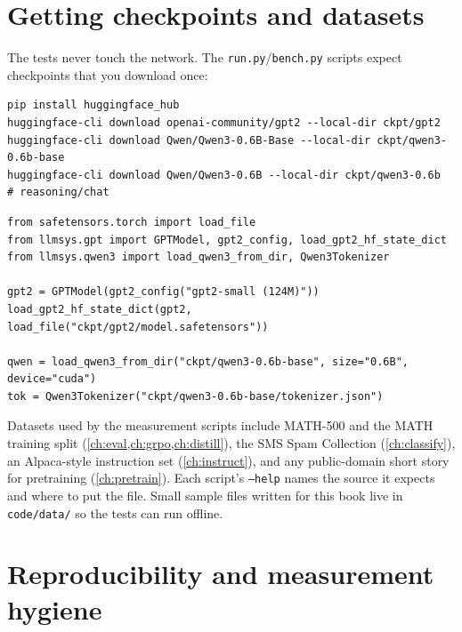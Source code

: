 \section{Getting checkpoints and datasets}

The tests never touch the network. The \texttt{run.py}/\texttt{bench.py} scripts expect
checkpoints that you download once:

\begin{lstlisting}[style=shell]
pip install huggingface_hub
huggingface-cli download openai-community/gpt2 --local-dir ckpt/gpt2
huggingface-cli download Qwen/Qwen3-0.6B-Base --local-dir ckpt/qwen3-0.6b-base
huggingface-cli download Qwen/Qwen3-0.6B --local-dir ckpt/qwen3-0.6b   # reasoning/chat
\end{lstlisting}

\begin{lstlisting}[caption={Loading the downloaded checkpoints into our from-scratch modules.},label={lst:setup:load}]
from safetensors.torch import load_file
from llmsys.gpt import GPTModel, gpt2_config, load_gpt2_hf_state_dict
from llmsys.qwen3 import load_qwen3_from_dir, Qwen3Tokenizer

gpt2 = GPTModel(gpt2_config("gpt2-small (124M)"))
load_gpt2_hf_state_dict(gpt2, load_file("ckpt/gpt2/model.safetensors"))

qwen = load_qwen3_from_dir("ckpt/qwen3-0.6b-base", size="0.6B", device="cuda")
tok = Qwen3Tokenizer("ckpt/qwen3-0.6b-base/tokenizer.json")
\end{lstlisting}

Datasets used by the measurement scripts include MATH-500 and the MATH training split
(\cref{ch:eval,ch:grpo,ch:distill}), the SMS Spam Collection (\cref{ch:classify}), an
Alpaca-style instruction set (\cref{ch:instruct}), and any public-domain short story for
pretraining (\cref{ch:pretrain}). Each script's \texttt{--help} names the source it expects
and where to put the file. Small sample files written for this book live in \texttt{code/data/}
so the tests can run offline.

\section{Reproducibility and measurement hygiene}

